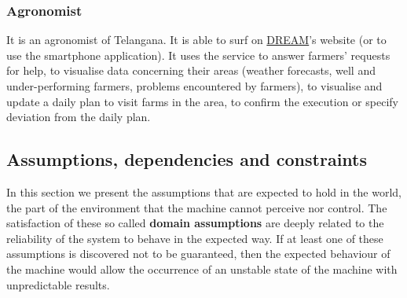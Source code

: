 \subsubsection{Agronomist}
It is an agronomist of Telangana. It is able to surf on \hyperref[tab:acronymsTable]{DREAM}’s website (or to use the smartphone application). It uses the service to answer farmers' requests for help, to visualise data concerning their areas (weather forecasts, well and under-performing farmers, problems encountered by farmers), to visualise and update a daily plan to visit farms in the area, to confirm the execution or specify deviation from the daily plan.

\newpage

\subsection{Assumptions, dependencies and constraints}
\label{sec:domain_assumptions}
In this section we present the assumptions that are expected to hold in the world, the part of the environment that the machine cannot perceive nor control. The satisfaction of these so called \textbf{domain assumptions} are deeply related to the reliability of the system to behave in the expected way. If at least one of these assumptions is discovered not to be guaranteed, then the expected behaviour of the machine would allow the occurrence of an unstable state of the machine with unpredictable results.
\newline

